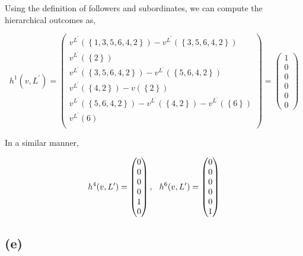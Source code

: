 \documentclass[american]{scrartcl}
\newcommand{\set}[1]{\left\{#1\right\}}
\begin{document}
Using the definition of followers and subordinates, we can compute the hierarchical outcomes as,

\begin{equation}
    h^1(v, L^\prime) = \begin{pmatrix}
        v^{L^\prime}(\set{1, 3, 5, 6, 4, 2}) - v^{L^\prime}(\set{3, 5, 6, 4, 2})          \\
        v^{L^\prime}(\set{2})                                                             \\
        v^{L^\prime}(\set{3, 5, 6, 4, 2}) - v^{L^\prime}(\set{5, 6, 4, 2})                \\
        v^{L^\prime}(\set{4, 2}) - v(\set{2})                                             \\
        v^{L^\prime}(\set{5, 6, 4, 2}) - v^{L^\prime}(\set{4, 2}) - v^{L^\prime}(\set{6}) \\
        v^{L^\prime}(6)                                                                   \\
    \end{pmatrix} = \begin{pmatrix}
        1 \\ 0 \\ 0 \\ 0 \\ 0 \\ 0
    \end{pmatrix}
\end{equation}

In a similar manner,

\begin{equation}
    h^4(v, L^\prime) = \begin{pmatrix}
        0 \\ 0 \\ 0 \\ 0 \\ 1 \\ 0
    \end{pmatrix}, \hspace{0.25cm}
    h^6(v, L^\prime) = \begin{pmatrix}
        0 \\ 0 \\ 0 \\ 0 \\ 0 \\ 1
    \end{pmatrix}
\end{equation}

\subsection*{(e)}
\end{document}
